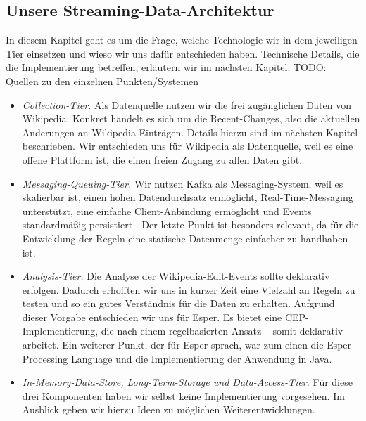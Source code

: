 \subsection{Unsere Streaming-Data-Architektur}
In diesem Kapitel geht es um die Frage, welche Technologie wir in dem jeweiligen Tier einsetzen und wieso wir uns dafür entschieden haben.
Technische Details, die die Implementierung betreffen, erläutern wir im nächsten Kapitel.
TODO: Quellen zu den einzelnen Punkten/Systemen
\begin{itemize}
    \item \textit{Collection-Tier.} Als Datenquelle nutzen wir die frei zugänglichen Daten von Wikipedia. Konkret handelt es sich um die Recent-Changes,
    also die aktuellen Änderungen an Wikipedia-Einträgen. Details hierzu sind im nächsten Kapitel beschrieben. Wir entschieden uns für Wikipedia als
    Datenquelle, weil es eine offene Plattform ist, die einen freien Zugang zu allen Daten gibt.

    \item \textit{Messaging-Queuing-Tier.} Wir nutzen Kafka als Messaging-System, weil es skalierbar ist, einen hohen Datendurchsatz ermöglicht,
    Real-Time-Messaging unterstützt, eine einfache Client-Anbindung ermöglicht und Events standardmäßig persistiert \cite{chellappan2018practical}. Der letzte Punkt ist
    besonders relevant, da für die Entwicklung der Regeln eine statische Datenmenge einfacher zu handhaben ist.

    \item \textit{Analysis-Tier.} Die Analyse der Wikipedia-Edit-Events sollte deklarativ erfolgen. Dadurch erhofften wir uns
    in kurzer Zeit eine Vielzahl an Regeln zu testen und so ein gutes Verständnis für die Daten zu erhalten. Aufgrund dieser Vorgabe
    entschieden wir uns für Esper. Es bietet eine CEP-Implementierung, die nach einem regelbasierten Ansatz -- somit deklarativ -- arbeitet.
    Ein weiterer Punkt, der für Esper sprach, war zum einen die Esper Processing Language und die Implementierung der Anwendung in Java.

    \item \textit{In-Memory-Data-Store, Long-Term-Storage und Data-Access-Tier.} Für diese drei Komponenten haben wir selbst keine Implementierung vorgesehen.
    Im Ausblick geben wir hierzu Ideen zu möglichen Weiterentwicklungen.
\end{itemize}